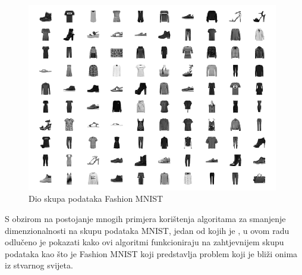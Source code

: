 \documentclass[times, utf8, diplomski]{fer}
\begin{document}
\begin{figure}[htb]
    \centering
    \includegraphics[width=11cm]{resources/images/reduction/compare/fmnist.png}
    \caption{Dio skupa podataka Fashion MNIST}
    \label{fig:fmnist}
\end{figure}

S obzirom na postojanje mnogih primjera korištenja algoritama za smanjenje dimenzionalnosti na skupu podataka MNIST, jedan od kojih je \cite{scikit-learn}, u ovom radu odlučeno je pokazati kako ovi algoritmi funkcioniraju na zahtjevnijem skupu podataka kao što je Fashion MNIST koji predstavlja problem koji je bliži onima iz stvarnog svijeta.
\end{document}
